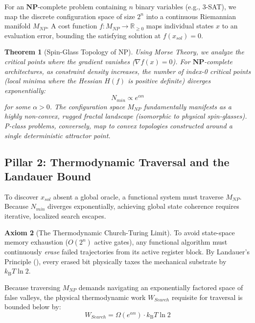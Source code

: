 \documentclass[12pt, a4paper]{article}
\newcommand{\NPc}{\mathbf{NP}}
\newcommand{\kB}{k_{\text{B}}}
\newcommand{\R}{\mathbb{R}}
\theoremstyle{plain}
\newtheorem{theorem}{Theorem}[section]
\theoremstyle{definition}
\newtheorem{axiom}[theorem]{Axiom}
\theoremstyle{remark}
\begin{document}
For an $\NPc$-complete problem containing $n$ binary variables (e.g., 3-SAT), we map the discrete configuration space of size $2^n$ into a continuous Riemannian manifold $M_{NP}$. A cost function $f: M_{NP} \to \R_{\geq 0}$ maps individual states $x$ to an evaluation error, bounding the satisfying solution at $f(x_{sol}) = 0$.

\begin{theorem}[Spin-Glass Topology of NP]
  Using Morse Theory, we analyze the critical points where the gradient vanishes ($\nabla f(x) = 0$). For $\NPc$-complete architectures, as constraint density increases, the number of index-0 critical points (local minima where the Hessian $H(f)$ is positive definite) diverges exponentially:
  \begin{equation}
    N_{min} \propto e^{\alpha n}
  \end{equation}
  for some $\alpha > 0$. The configuration space $M_{NP}$ fundamentally manifests as a highly non-convex, rugged fractal landscape (isomorphic to physical spin-glasses). P-class problems, conversely, map to convex topologies constructed around a single deterministic attractor point.
\end{theorem}

\subsection{Pillar 2: Thermodynamic Traversal and the Landauer Bound}\label{sec:thermo_traversal}

To discover $x_{sol}$ absent a global oracle, a functional system must traverse $M_{NP}$. Because $N_{min}$ diverges exponentially, achieving global state coherence requires iterative, localized search escapes.

\begin{axiom}[The Thermodynamic Church-Turing Limit]\label{ax:tctt}
To avoid state-space memory exhaustion ($O(2^n)$ active gates), any functional algorithm must continuously \emph{erase} failed trajectories from its active register block. By Landauer's Principle (), every erased bit physically taxes the mechanical substrate by $\kB T \ln 2$.
\end{axiom}

Because traversing $M_{NP}$ demands navigating an exponentially factored space of false valleys, the physical thermodynamic work $W_{Search}$ requisite for traversal is bounded below by:
\begin{equation}\label{eq:search_cost}
    W_{Search} = \Omega(e^{\alpha n}) \cdot \kB T \ln 2
\end{equation}
\end{document}
